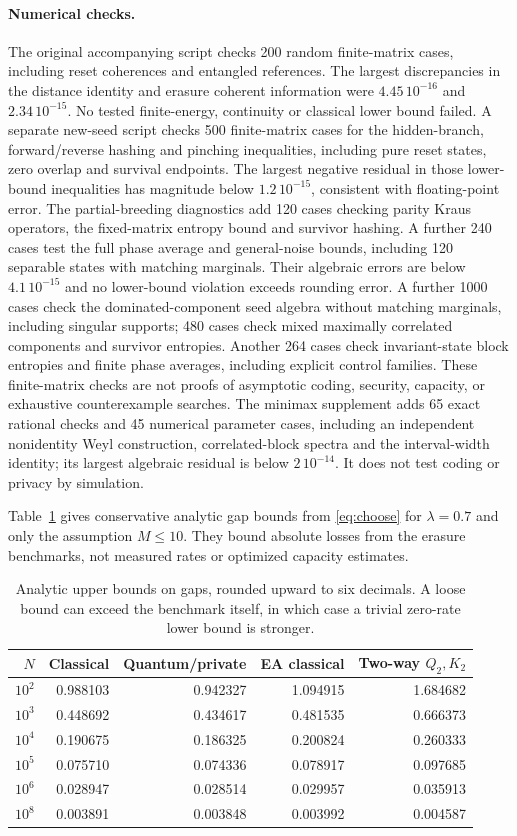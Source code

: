 \documentclass[11pt]{article}
\begin{document}
\paragraph{Numerical checks.}
The original accompanying script checks 200 random finite-matrix cases, including
reset coherences and entangled references.
The largest discrepancies in the distance identity and erasure coherent
information were $4.45\,10^{-16}$ and $2.34\,10^{-15}$.
No tested finite-energy, continuity or classical lower bound failed.
A separate new-seed script checks 500 finite-matrix cases for the
hidden-branch, forward/reverse hashing and pinching inequalities,
including pure reset states, zero overlap and survival endpoints.
The largest negative residual in those lower-bound inequalities has
magnitude below $1.2\,10^{-15}$, consistent with floating-point error.
The partial-breeding diagnostics add 120 cases checking parity Kraus
operators, the fixed-matrix entropy bound and survivor hashing.
A further 240 cases test the full phase average and general-noise bounds,
including 120 separable states with matching marginals. Their algebraic
errors are below $4.1\,10^{-15}$ and no lower-bound violation exceeds
rounding error. A further 1000 cases check the dominated-component
seed algebra without matching marginals, including singular supports;
480 cases check mixed maximally correlated components and survivor
entropies. Another 264 cases check invariant-state block entropies and
finite phase averages, including explicit control families. These
finite-matrix checks are not proofs of asymptotic coding,
security, capacity, or exhaustive counterexample searches.
The minimax supplement adds 65 exact rational checks and 45 numerical
parameter cases, including an independent nonidentity Weyl construction,
correlated-block spectra and the interval-width identity; its largest
algebraic residual is below $2\,10^{-14}$. It does not test coding
or privacy by simulation.

Table~\ref{tab:bounds} gives conservative analytic gap bounds from
\eqref{eq:choose} for $\lambda=0.7$ and only the assumption $M\le10$.
They bound absolute losses from the erasure benchmarks, not measured
rates or optimized capacity estimates.
\begin{table}[ht]
\centering
\small\begin{tabular}{rrrrr}
\toprule
$N$&Classical&Quantum/private&EA classical&Two-way $Q_2,K_2$\\
\midrule
$10^{2}$&0.988103&0.942327&1.094915&1.684682\\
$10^{3}$&0.448692&0.434617&0.481535&0.666373\\
$10^{4}$&0.190675&0.186325&0.200824&0.260333\\
$10^{5}$&0.075710&0.074336&0.078917&0.097685\\
$10^{6}$&0.028947&0.028514&0.029957&0.035913\\
$10^{8}$&0.003891&0.003848&0.003992&0.004587\\
\bottomrule
\end{tabular}
\caption{Analytic upper bounds on gaps, rounded upward to six decimals.
A loose bound can exceed the benchmark itself, in which case a trivial
zero-rate lower bound is stronger.}\label{tab:bounds}
\end{table}
\end{document}
